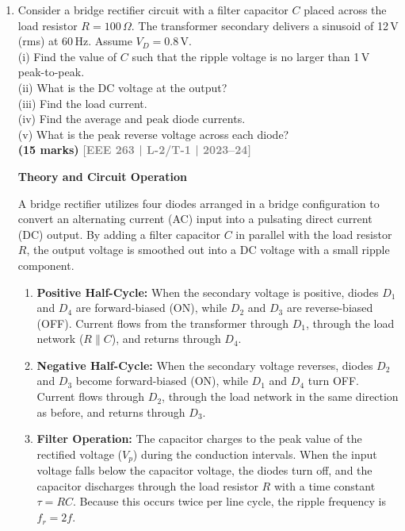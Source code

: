 \documentclass[12pt,a3paper]{article}
\newcommand{\yr}[1]{\hfill\textcolor{gray}{\small\textbf{[#1]}}}
\newcommand{\mk}[1]{\textcolor{orange!70!black}{\small\textbf{(#1 marks)}}}
\begin{document}
\begin{enumerate}
    
\item Consider a bridge rectifier circuit with a filter capacitor $C$ placed across the load resistor $R=100\,\Omega$. The transformer secondary delivers a sinusoid of 12\,V (rms) at 60\,Hz. Assume $V_D=0.8\,\text{V}$.\\
 (i) Find the value of $C$ such that the ripple voltage is no larger than 1\,V peak-to-peak. \\
 (ii) What is the DC voltage at the output? \\
 (iii) Find the load current. \\
 (iv) Find the average and peak diode currents. \\
 (v) What is the peak reverse voltage across each diode?\\
\mk{15} \yr{EEE 263 | L-2/T-1 | 2023--24}

\begin{tcolorbox}[enhanced,breakable,ansbox,colback=cA!4,colframe=cA,boxrule=0.8pt,arc=5pt,title={\textbf{Answer}},fonttitle=\bfseries\color{white},colbacktitle=cA]

\textbf{Theory and Circuit Operation}

A bridge rectifier utilizes four diodes arranged in a bridge configuration to convert an alternating current (AC) input into a pulsating direct current (DC) output. By adding a filter capacitor $C$ in parallel with the load resistor $R$, the output voltage is smoothed out into a DC voltage with a small ripple component.

\begin{enumerate}
    \item \textbf{Positive Half-Cycle:} When the secondary voltage is positive, diodes $D_1$ and $D_4$ are forward-biased (ON), while $D_2$ and $D_3$ are reverse-biased (OFF). Current flows from the transformer through $D_1$, through the load network ($R \parallel C$), and returns through $D_4$.
    \item \textbf{Negative Half-Cycle:} When the secondary voltage reverses, diodes $D_2$ and $D_3$ become forward-biased (ON), while $D_1$ and $D_4$ turn OFF. Current flows through $D_2$, through the load network in the same direction as before, and returns through $D_3$.
    \item \textbf{Filter Operation:} The capacitor charges to the peak value of the rectified voltage ($V_p$) during the conduction intervals. When the input voltage falls below the capacitor voltage, the diodes turn off, and the capacitor discharges through the load resistor $R$ with a time constant $\tau = RC$. Because this occurs twice per line cycle, the ripple frequency is $f_r = 2f$.
\end{enumerate}


\end{tcolorbox}
\end{enumerate}
\end{document}
